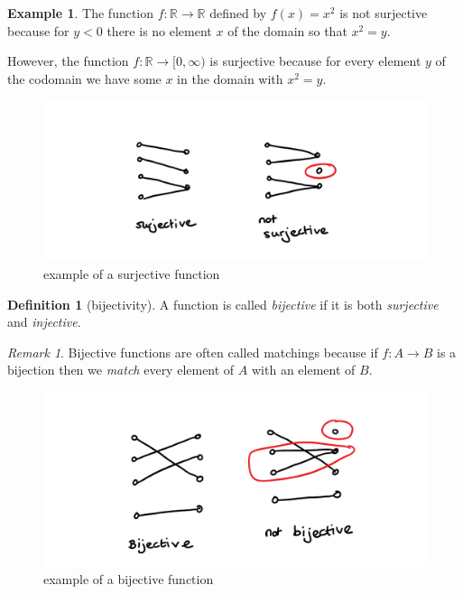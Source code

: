 \documentclass[
]{book}
\theoremstyle{definition}
\newtheorem{definition}{Definition}[chapter]
\theoremstyle{definition}
\newtheorem{example}{Example}[chapter]
\theoremstyle{definition}
\theoremstyle{definition}
\theoremstyle{remark}
\newtheorem*{remark}{Remark}
\begin{document}
\begin{example}
The function \(f:\mathbb{R} \rightarrow \mathbb{R}\) defined by \(f(x) = x^2\) is not surjective because for \(y<0\) there is no element \(x\) of the domain so that \(x^2=y\).

However, the function \(f: \mathbb{R} \rightarrow [0,\infty)\) is surjective because for every element \(y\) of the codomain we have some \(x\) in the domain with \(x^2 =y\).
\end{example}

\begin{figure}
\centering
\includegraphics{surjective.png}
\caption{\label{fig:unnamed-chunk-3}example of a surjective function}
\end{figure}

\begin{definition}[bijectivity]
A function is called \emph{bijective} if it is both \emph{surjective} and \emph{injective}.
\end{definition}

\begin{remark}
Bijective functions are often called matchings because if \(f: A \rightarrow B\) is a bijection then we \emph{match} every element of \(A\) with an element of \(B\).
\end{remark}

\begin{figure}
\centering
\includegraphics{bijective.png}
\caption{\label{fig:unnamed-chunk-4}example of a bijective function}
\end{figure}
\end{document}
